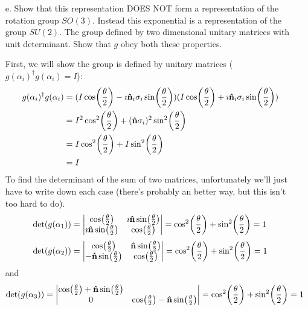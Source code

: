 \documentclass[a4paper,twoside]{article}
\begin{document}
\begin{itemize}
    \item[e.] Show that this representation DOES NOT form a representation of the rotation group $ SO(3) $. Instead this exponential is a representation of the group $ SU(2) $. The group defined by two dimensional unitary matrices with unit determinant. Show that $ g $ obey both these properties.
        \begin{problem}
            First, we will show the group is defined by unitary matrices ($ g(\alpha_i)^\dagger g(\alpha_i) = I $):
            \begin{align}
                g(\alpha_i)^\dagger g(\alpha_i) &= (I \cos(\frac{\theta}{2}) - \imath\vu{ n}_i \sigma_i \sin(\frac{\theta}{2}) )(I \cos(\frac{\theta}{2}) + \imath\vu{ n}_i \sigma_i \sin(\frac{\theta}{2})) \\
                &= I^2 \cos[2](\frac{\theta}{2}) +(\vu{ n}  \sigma_i)^2 \sin[2](\frac{\theta}{2}) \\
                &= I\cos[2](\frac{\theta}{2}) + I\sin[2](\frac{\theta}{2}) \\
                &= I
            \end{align}
            To find the determinant of the sum of two matrices, unfortunately we'll just have to write down each case (there's probably an better way, but this isn't too hard to do).
            \begin{equation}
                \det(g(\alpha_1)) = \mdet{\cos(\frac{\theta}{2}) & \imath\vu{ n} \sin(\frac{\theta}{2}) \\ \imath\vu{ n} \sin(\frac{\theta}{2}) & \cos(\frac{\theta}{2})} = \cos[2](\frac{\theta}{2}) + \sin[2](\frac{\theta}{2}) = 1
            \end{equation}
            \begin{equation}
                \det(g(\alpha_2)) = \mdet{ \cos(\frac{\theta}{2}) & \vu{ n} \sin(\frac{\theta}{2}) \\ -\vu{ n} \sin(\frac{\theta}{2}) & \cos(\frac{\theta}{2})} = \cos[2](\frac{\theta}{2}) + \sin[2](\frac{\theta}{2}) = 1
            \end{equation}
            and
            \begin{equation}
                \det(g(\alpha_3)) = \mdet{ \cos(\frac{\theta}{2}) + \vu{ n} \sin(\frac{\theta}{2}) \\ 0 & \cos(\frac{\theta}{2}) -\vu{ n} \sin(\frac{\theta}{2})} = \cos[2](\frac{\theta}{2}) + \sin[2](\frac{\theta}{2}) = 1
            \end{equation}


\end{problem}
\end{itemize}
\end{document}
